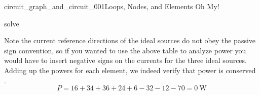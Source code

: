 \begin{mainquestion}{circuit_graph_and_circuit_001}{Loops, Nodes, and Elements Oh My!}
\begin{partquestion}{solve}
\begin{answer}
\begin{table}[htbp]
\end{table}

Note the current reference directions of the ideal sources do not obey the passive sign convention, so if you wanted to use the above table to analyze power you would have to insert negative signs on the currents for the three ideal sources. Adding up the powers for each element, we indeed verify that power is conserved
.
\[
P = 16 + 34 + 36 + 24 + 6 -32 - 12 - 70 = \qty{0}{\watt}
\]

\end{answer}
\end{partquestion}
\end{mainquestion}